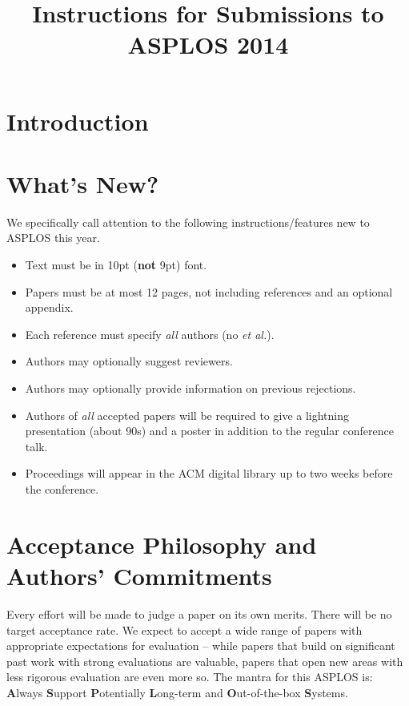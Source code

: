 \documentclass[pageno]{jpaper}
\begin{document}
\title{
Instructions for Submissions to ASPLOS 2014}

\date{}
\maketitle

\thispagestyle{empty}

\begin{abstract}


\end{abstract}

\section{Introduction}
\label{intro}


\section{What's New?}

We specifically call attention to the following instructions/features new
to ASPLOS this year. 

\begin{itemize} 
\item Text must be in 10pt ({\bf not} 9pt) font.
\item Papers must be at most 12 pages, not including references and an
optional appendix. 
\item Each reference must specify {\em all} authors (no {\em et al.}).
\item Authors may optionally suggest reviewers. 
\item Authors may optionally provide information on previous rejections.
\item Authors of {\em all} accepted papers will be required to give a
lightning presentation (about 90s) and a poster in addition to the regular
conference talk.
\item Proceedings will appear in the ACM digital library up to two weeks
before the conference.
\end{itemize} 

\section{Acceptance Philosophy and Authors' Commitments}

Every effort will be made to judge a paper on its own merits. There will be
no target acceptance rate. We expect to accept a wide range of papers with
appropriate expectations for evaluation -- while papers that build on
significant past work with strong evaluations are valuable, papers that
open new areas with less rigorous evaluation are even more so.  The mantra
for this ASPLOS is: {\bf A}lways {\bf S}upport {\bf P}otentially {\bf
L}ong-term and {\bf O}ut-of-the-box {\bf S}ystems.
\end{document}
